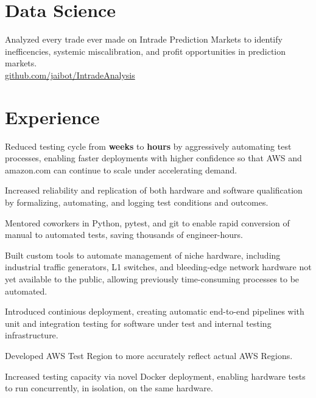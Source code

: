 \documentclass[]{resume}
\begin{document}
\begin{minipage}[t]{0.66\textwidth} 



\section {Data Science}
Analyzed every trade ever made on Intrade Prediction Markets to identify
inefficencies, systemic miscalibration, and profit opportunities in prediction markets.\\
\href{http://github.com/jaibot/IntradeAnalysis}{github.com/jaibot/IntradeAnalysis }

\section{Experience}
\vspace{\topsep} %
\begin{tightemize}
\item Reduced testing cycle from \textbf{weeks} to \textbf{hours} by aggressively automating test processes, enabling faster deployments with higher confidence so that AWS and amazon.com can continue to scale under accelerating demand.
\item Increased reliability and replication of both hardware and software qualification by formalizing, automating, and logging test conditions and outcomes.
\item Mentored coworkers in Python, pytest, and git to enable rapid conversion of manual to automated tests, saving thousands of engineer-hours.
\item Built custom tools to automate management of niche hardware, including industrial traffic generators, L1 switches, and bleeding-edge network hardware not yet available to the public, allowing previously time-consuming processes to be automated.
\item Introduced continious deployment, creating automatic end-to-end pipelines with unit and integration testing for software under test and internal testing infrastructure.
\item Developed AWS Test Region to more accurately reflect actual AWS Regions.
\item Increased testing capacity via novel Docker deployment, enabling hardware tests to run concurrently, in isolation, on the same hardware.
\end{tightemize}
\sectionsep


\end{minipage}
\end{document}
